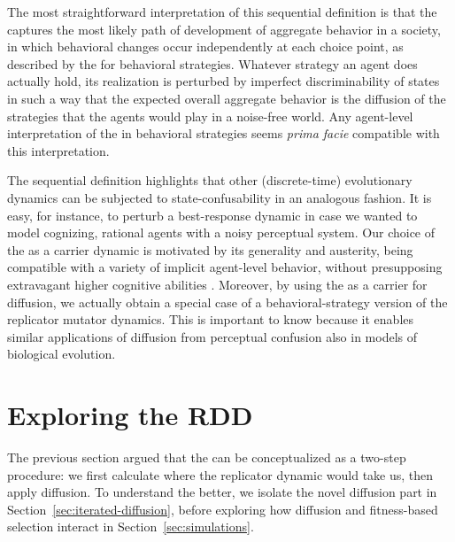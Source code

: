 \documentclass[fleqn,reqno,10pt]{article}
\newcommand{\rd}{\acro{rd}} %
\newcommand{\rmd}{\acro{rmd}} %
\newcommand{\rdd}{\acro{rdd}} %
\begin{document}
The most straightforward interpretation of this sequential definition
is that the \rdd captures the most likely path of development of
aggregate behavior in a society, in which behavioral changes occur
independently at each choice point, as described by the \rd for
behavioral strategies. Whatever strategy an agent does actually hold,
its realization is perturbed by imperfect discriminability of states
in such a way that the expected overall aggregate behavior is the
diffusion of the strategies that the agents would play in a noise-free
world. Any agent-level interpretation of the \rd in behavioral
strategies seems \emph{prima facie} compatible with this
interpretation.

The sequential definition highlights that other (discrete-time)
evolutionary dynamics can be subjected to state-confusability in an
analogous fashion. It is easy, for instance, to perturb a
best-response dynamic in case we wanted to model cognizing, rational
agents with a noisy perceptual system. Our choice of the \rd as a
carrier dynamic is motivated by its generality and austerity, being
compatible with a variety of implicit agent-level behavior, without
presupposing extravagant higher cognitive abilities
\citep[c.f.][]{Sandholm2013:Population-Game}. Moreover, by using the
\rd as a carrier for diffusion, we actually obtain a special case of a
behavioral-strategy version of the replicator mutator dynamics. This
is important to know because it enables similar applications of
diffusion from perceptual confusion also in models of biological
evolution.




\section{Exploring the RDD}
\label{sec:exploring-rdd}

The previous section argued that the \rdd can be conceptualized as a
two-step procedure: we first calculate where the replicator dynamic
would take us, then apply diffusion. To understand the \rdd better, we
isolate the novel diffusion part in
Section~\ref{sec:iterated-diffusion}, before exploring how diffusion
and fitness-based selection interact in Section~\ref{sec:simulations}.
\end{document}

